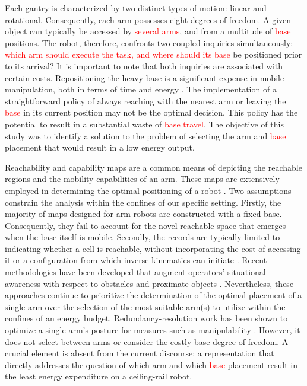 \documentclass[conference]{IEEEtran}
\begin{document}
Each gantry is characterized by two distinct types of motion: linear and rotational. 
Consequently, each arm possesses eight degrees of freedom. 
A given object can typically be accessed by \textcolor{red}{several arms}, and from a multitude of
\textcolor{red}{base} positions. 
The robot, therefore, confronts two coupled inquiries simultaneously: 
\textcolor{red}{which arm should execute the task, and where should its base}
be positioned prior to its arrival? It is important to note that both 
inquiries are associated with certain costs. 
Repositioning the heavy base is a significant expense in mobile manipulation, 
both in terms of time and energy \cite{MoMaPos2024,BaSeNet2024,EnergySLR2024}. 
The implementation of a straightforward policy of always reaching with 
the nearest arm or leaving the \textcolor{red}{base} in its current position may not be the optimal decision.
This policy has the potential to result in a substantial waste of \textcolor{red}{base travel}. 
The objective of this study was to identify a solution to the problem of 
selecting the arm and \textcolor{red}{base} placement that would result in a low energy output.

Reachability and capability maps are a common means of depicting the reachable 
regions and the mobility capabilities of an arm. These maps are extensively 
employed in determining the optimal positioning of a robot \cite{Zacharias2007,Makhal2018}. 
Two assumptions constrain the analysis within the confines of our specific setting. 
Firstly, the majority of maps designed for arm robots are constructed with a fixed base. 
Consequently, they fail to account for the novel reachable space that emerges when the base 
itself is mobile. Secondly, the records are typically limited to indicating 
whether a cell is reachable, without incorporating the cost of accessing it 
or a configuration from which inverse kinematics can initiate \cite{Zacharias2007}. 
Recent methodologies have been developed that augment operators' situational awareness 
with respect to obstacles and proximate objects
\cite{MoMaPos2024,InvReach2022}. Nevertheless, these approaches continue to 
prioritize the determination of the optimal placement of a single arm over 
the selection of the most suitable arm(s) to utilize within the confines 
of an energy budget.
Redundancy-resolution work has been shown to optimize a single arm's 
posture for measures such as manipulability \cite{Yoshikawa1985}. 
However, it does not select between arms or consider the costly base degree of freedom. 
A crucial element is absent from the current discourse: a representation that 
directly addresses the question of which arm and which \textcolor{red}{base} placement result
in the least energy expenditure on a ceiling-rail robot.
\end{document}
